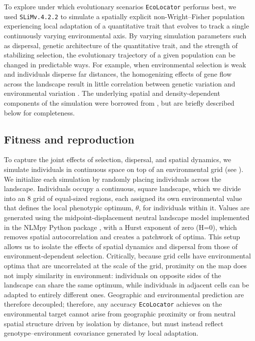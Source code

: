 \documentclass[]{article}
\newcommand{\ecolocator}{\texttt{EcoLocator}\xspace}
\newcommand{\slim}{\texttt{SLiM}\xspace}
\begin{document}
To explore under which evolutionary scenarios \ecolocator performs best,
we used \slim \texttt{v.4.2.2} \citep{haller2023slim4} 
to simulate a spatially explicit non-Wright--Fisher population
experiencing local adaptation of a quantitative trait
that evolves to track a single continuously varying environmental axis.
By varying simulation parameters such as dispersal, genetic architecture of the quantitative trait,
and the strength of stabilizing selection,
the evolutionary trajectory of a given population
can be changed in predictable ways.
For example, when environmental selection is weak
and individuals disperse far distances,
the homogenizing effects of gene flow across the landscape
result in little correlation between genetic variation and environmental variation
\citep{lenormand_gene_2002,kawecki_conceptual_2004,booker_wza_2024}.
The underlying spatial and density-dependent components of the 
simulation were borrowed from \citet{chevy_popgen_ecology_2025},
but are briefly described below for completeness.

\subsection{Fitness and reproduction}

To capture the joint effects of selection, dispersal,
and spatial dynamics,
we simulate individuals in continuous space
on top of an environmental grid (see ).
We initialize each simulation
by randomly placing individuals across the landscape.
Individuals occupy a continuous, square landscape, 
which we divide into an 8 grid of equal-sized regions, 
each assigned its own environmental value that defines the local phenotypic optimum, 
$\theta$, for individuals within it.
Values are generated using the midpoint-displacement neutral landscape model 
implemented in the NLMpy Python package \citep{etherington_nlmpy_2015},
with a Hurst exponent of zero (H=0),
which removes spatial autocorrelation
and creates a patchwork of optima.
This setup allows us to isolate the effects
of spatial dynamics and dispersal
from those of environment-dependent selection.
Critically, because grid cells have environmental optima that are
uncorrelated at the scale of the grid, 
proximity on the map does not imply 
similarity in environment: 
individuals on opposite sides of the landscape can share 
the same optimum, while individuals in adjacent 
cells can be adapted to entirely different ones.
Geographic and environmental prediction are therefore decoupled;
therefore, any accuracy \ecolocator achieves on the
environmental target cannot arise from geographic
proximity or from neutral spatial structure driven by isolation by distance,
but must instead reflect genotype--environment covariance
generated by local adaptation.
\end{document}
